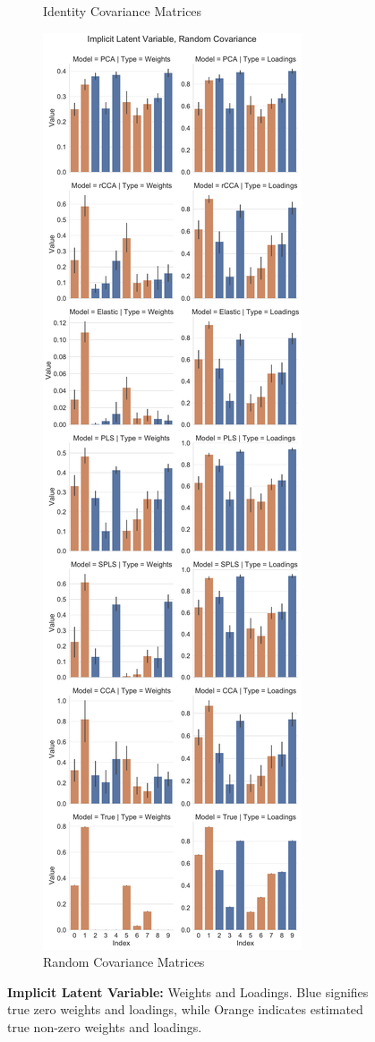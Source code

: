 \begin{figure}
\begin{subfigure}{0.49\linewidth}
        \caption{Identity Covariance Matrices}
    \end{subfigure}
    \begin{subfigure}{0.49\linewidth}
        \centering
        \includegraphics[width=\linewidth]{figures/simulated/low/Combined_Weights_Loadings_with_Error_Bars_Random_Covariance_implicit}
        \caption{Random Covariance Matrices}
    \end{subfigure}
    \caption{\textbf{Implicit Latent Variable:} Weights and Loadings. Blue signifies true zero weights and loadings, while Orange indicates estimated true non-zero weights and loadings.}\label{fig:implicit-latent-variable-weights-loadings}
\end{figure}

